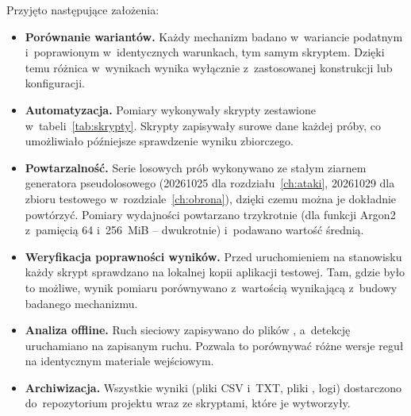 Przyjęto następujące założenia:
\begin{itemize}
  \item \textbf{Porównanie wariantów.} Każdy mechanizm badano w~wariancie podatnym i~poprawionym w~identycznych warunkach, tym samym skryptem. Dzięki temu różnica w~wynikach wynika wyłącznie z~zastosowanej konstrukcji lub konfiguracji.
  \item \textbf{Automatyzacja.} Pomiary wykonywały skrypty zestawione w~tabeli~\ref{tab:skrypty}. Skrypty zapisywały surowe dane każdej próby, co umożliwiało późniejsze sprawdzenie wyniku zbiorczego.
  \item \textbf{Powtarzalność.} Serie losowych prób wykonywano ze stałym ziarnem generatora pseudolosowego (20261025 dla rozdziału~\ref{ch:ataki}, 20261029 dla zbioru testowego w~rozdziale~\ref{ch:obrona}), dzięki czemu można je dokładnie powtórzyć. Pomiary wydajności powtarzano trzykrotnie (dla funkcji Argon2 z~pamięcią 64 i~256~MiB -- dwukrotnie) i~podawano wartość średnią.
  \item \textbf{Weryfikacja poprawności wyników.} Przed uruchomieniem na stanowisku każdy skrypt sprawdzano na lokalnej kopii aplikacji testowej. Tam, gdzie było to możliwe, wynik pomiaru porównywano z~wartością wynikającą z~budowy badanego mechanizmu.
  \item \textbf{Analiza offline.} Ruch sieciowy zapisywano do plików , a~detekcję uruchamiano na zapisanym ruchu. Pozwala to porównywać różne wersje reguł na identycznym materiale wejściowym.
  \item \textbf{Archiwizacja.} Wszystkie wyniki (pliki CSV i~TXT, pliki , logi) dostarczono do~repozytorium projektu wraz ze skryptami, które je wytworzyły.
\end{itemize}

